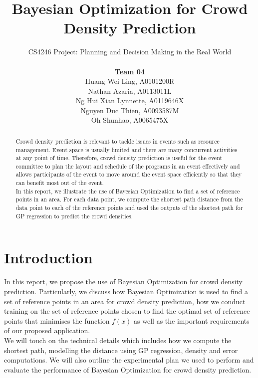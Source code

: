 \documentclass[letterpaper]{article}
\begin{document}
%
\title{Bayesian Optimization for Crowd Density Prediction}
\author{CS4246 Project: Planning and Decision Making in the Real World  \\ \\
{\bf Team 04} \\
Huang Wei Ling, A0101200R\\
Nathan Azaria, A0113011L\\
Ng Hui Xian Lynnette, A0119646X\\
Nguyen Duc Thien, A0093587M\\
Oh Shunhao, A0065475X\\
}
\maketitle
\begin{abstract}
Crowd density prediction is relevant to tackle issues in events such as resource management. Event space is usually limited and there are many concurrent activities at any point of time. Therefore, crowd density prediction is useful for the event committee to plan the layout and schedule of the programs in an event effectively and allows participants of the event to move around the event space efficiently so that they can benefit most out of the event. \\

In this report, we illustrate the use of Bayesian Optimization to find a set of reference points in an area. For each data point, we compute the shortest path distance from the data point to each of the reference points and used the outputs of the shortest path for GP regression to predict the crowd densities.
\end{abstract}

\section{Introduction}
In this report, we propose the use of Bayesian Optimization for crowd density prediction. Particularly, we discuss how Bayesian Optimization is used to find a set of reference points in an area for crowd density prediction, how we conduct training on the set of reference points chosen to find the optimal set of reference points that minimises the function $f(x)$ as well as the important requirements of our proposed application. \\

We will touch on the technical details which includes how we compute the shortest path, modelling the distance using GP regression, density and error computations. We will also outline the experimental plan we used to perform and evaluate the performance of Bayesian Optimization for crowd density prediction. \\
\end{document}
